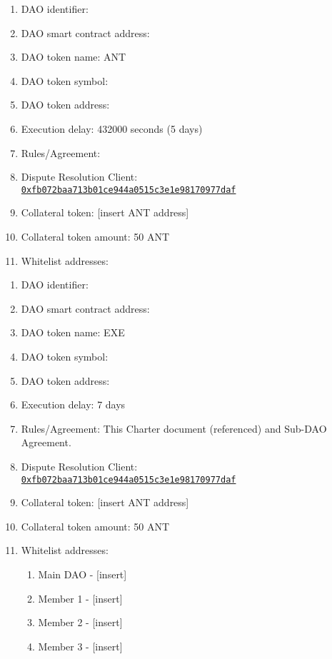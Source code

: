 
\label{chap:DAOParameters}

\begin{itemize}
	\begin{enumerate}[noitemsep]
		\item \ac{DAO} identifier:
		\item \ac{DAO} smart contract address:
		\item \ac{DAO} token name: \ac{ANT}
		\item \ac{DAO} token symbol:
		\item \ac{DAO} token address:
		\item Execution delay: 432000 seconds (5 days)
		\item Rules/Agreement: 
		\item Dispute Resolution Client:\\ \href{https://etherscan.io/address/0xfb072baa713b01ce944a0515c3e1e98170977daf}{\texttt{0xfb072baa713b01ce944a0515c3e1e98170977daf}}
		\item Collateral token: [insert \ac{ANT} address]
		\item Collateral token amount: 50 \ac{ANT}
		\item Whitelist addresses:
	\end{enumerate}

	\begin{enumerate}[noitemsep]
		\item \ac{DAO} identifier:
		\item \ac{DAO} smart contract address:
		\item \ac{DAO} token name: EXE
		\item \ac{DAO} token symbol:
		\item \ac{DAO} token address:
		\item Execution delay: 7 days
		\item Rules/Agreement: This Charter document (referenced) and Sub-\ac{DAO} Agreement.
		\item Dispute Resolution Client:\\ \href{https://etherscan.io/address/0xfb072baa713b01ce944a0515c3e1e98170977daf}{\texttt{0xfb072baa713b01ce944a0515c3e1e98170977daf}}
		\item Collateral token: [insert \ac{ANT} address]
		\item Collateral token amount: 50 \ac{ANT}
		\item Whitelist addresses:
		\begin{enumerate}
			\item Main \ac{DAO} - [insert]
			\item Member 1 - [insert]
			\item Member 2 - [insert]
			\item Member 3 - [insert]
		\end{enumerate}
	\end{enumerate}


\end{itemize}
